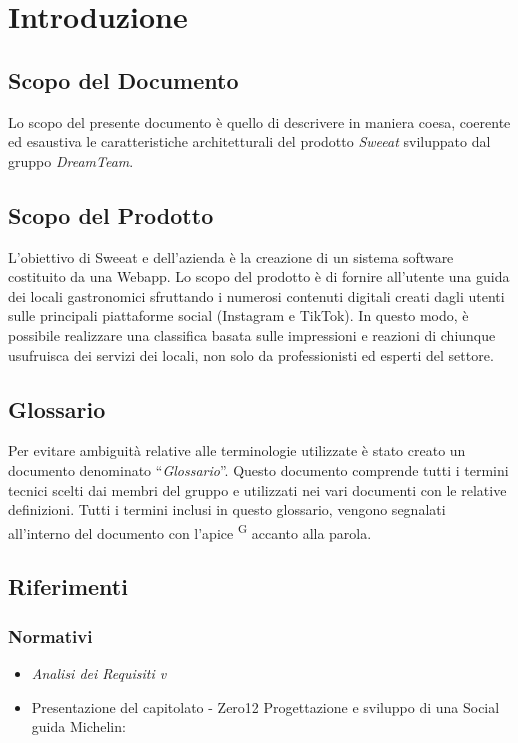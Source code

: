 \section{Introduzione}

\subsection{Scopo del Documento}
Lo scopo del presente documento è quello di descrivere in maniera coesa, coerente ed esaustiva le caratteristiche architetturali del prodotto \textit{Sweeat} sviluppato dal gruppo \textit{DreamTeam}.


\subsection{Scopo del Prodotto}
L’obiettivo di Sweeat e dell’azienda \zd è la creazione di un sistema software costituito da una Webapp. Lo scopo del prodotto è di fornire all’utente una guida dei locali gastronomici sfruttando i numerosi contenuti digitali creati dagli utenti sulle principali piattaforme social (Instagram e TikTok).
In questo modo, è possibile realizzare una classifica basata sulle impressioni e reazioni di chiunque usufruisca dei servizi dei locali, non solo da professionisti ed esperti del settore.


\subsection{Glossario}
Per evitare ambiguità relative alle terminologie utilizzate è stato creato un documento denominato “\textit{Glossario}”. Questo documento comprende tutti i termini tecnici scelti dai membri del gruppo e utilizzati nei vari documenti con le relative definizioni. Tutti i termini inclusi in questo glossario, vengono segnalati all'interno del documento con l'apice \textsuperscript{G} accanto alla parola.

\subsection{Riferimenti}
\subsubsection{Normativi}
\begin{itemize}
\item \textit{Analisi dei Requisiti v}
\item Presentazione del capitolato - Zero12 Progettazione e sviluppo di una Social guida Michelin:
\newline {}
\end{itemize}
